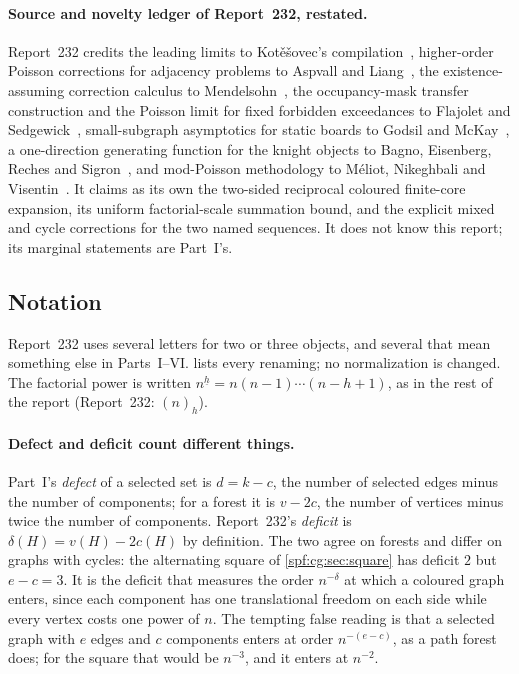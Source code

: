 \documentclass[11pt]{article}
\numberwithin{equation}{section}
\theoremstyle{definition}
\theoremstyle{remark}
\theoremstyle{definition}
\newcommand{\fall}[2]{{#1}^{\underline{#2}}}
\begin{document}
\paragraph{Source and novelty ledger of Report~232, restated.}
Report~232 credits the leading limits to Kot\v e\v sovec's
compilation~\cite{cgKotesovec}, higher-order Poisson corrections for
adjacency problems to Aspvall and Liang~\cite{cgAspvall}, the existence-assuming
correction calculus to Mendelsohn~\cite{fdMendelsohn}, the occupancy-mask
transfer construction and the Poisson limit for fixed forbidden exceedances to
Flajolet and Sedgewick~\cite{cgFS}, small-subgraph asymptotics for static
boards to Godsil and McKay~\cite{cgGodsil}, a one-direction generating
function for the knight objects to Bagno, Eisenberg, Reches and
Sigron~\cite{cgBagno}, and mod-Poisson methodology to M\'eliot, Nikeghbali
and Visentin~\cite{cgModPoisson}. It claims as its own the two-sided
reciprocal coloured finite-core expansion, its uniform factorial-scale
summation bound, and the explicit mixed and cycle corrections for the two
named sequences. It does not know this report; its marginal statements are
Part~I's.

\subsection{Notation}
\label{spf:cg:sec:notation}

Report~232 uses several letters for two or three objects, and several that
mean something else in Parts~I--VI.  lists every
renaming; no normalization is changed. The factorial power is written
$\fall nh=n(n-1)\cdots(n-h+1)$, as in the rest of the report (Report~232:
$(n)_h$).

\paragraph{Defect and deficit count different things.}
Part~I's \emph{defect} of a selected set is $d=k-c$, the number of selected
edges minus the number of components; for a forest it is $v-2c$, the number
of vertices minus twice the number of components. Report~232's
\emph{deficit} is $\delta(H)=v(H)-2c(H)$ by definition. The two agree on
forests and differ on graphs with cycles: the alternating square of
\cref{spf:cg:sec:square} has deficit $2$ but $e-c=3$. It is the deficit that
measures the order $n^{-\delta}$ at which a coloured graph enters, since each
component has one translational freedom on each side while every vertex costs
one power of $n$. The tempting false reading is that a selected graph with
$e$ edges and $c$ components enters at order $n^{-(e-c)}$, as a path forest
does; for the square that would be $n^{-3}$, and it enters at $n^{-2}$.
\end{document}
